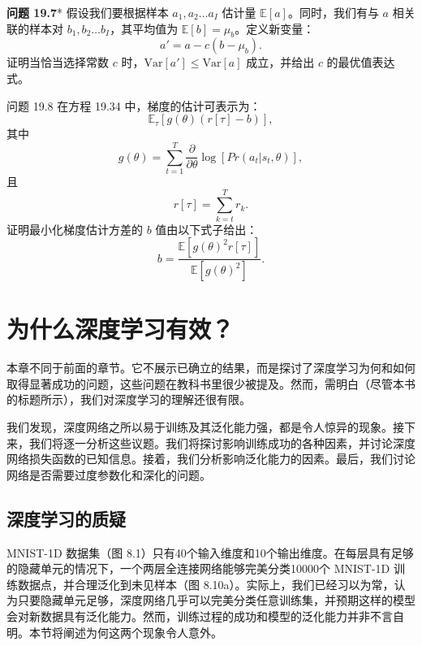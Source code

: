 \documentclass[lang=cn,newtx,10pt,scheme=chinese]{elegantbook}
\begin{document}
\textbf{问题 19.7}* 假设我们要根据样本 \(a_1, a_2 \ldots a_I\) 估计量 \(\mathbb{E}[a]\)。同时，我们有与 \(a\) 相关联的样本对 \(b_1, b_2 \ldots b_I\)，其平均值为 \(\mathbb{E}[b] = \mu_b\)。定义新变量：
\begin{equation}
a' = a - c(b - \mu_b). 
\end{equation}
证明当恰当选择常数 \(c\) 时，\(\text{Var}[a'] \leq \text{Var}[a]\) 成立，并给出 \(c\) 的最优值表达式。

问题 19.8 在方程 19.34 中，梯度的估计可表示为：
\begin{equation}
\mathbb{E}_\tau \left[ g(\theta)(r[\tau] - b) \right], 
\end{equation}
其中
\begin{equation}
g(\theta) = \sum_{t=1}^{T} \frac{\partial}{\partial \theta} \log[Pr(a_t|s_t, \theta)], 
\end{equation}
且
\begin{equation}
r[\tau] = \sum_{k=t}^{T} r_k. 
\end{equation}
证明最小化梯度估计方差的 \(b\) 值由以下式子给出：
\begin{equation}
b = \frac{\mathbb{E}[g(\theta)^2r[\tau]]}{\mathbb{E}[g(\theta)^2]}. 
\end{equation}

\chapter{为什么深度学习有效？}

本章不同于前面的章节。它不展示已确立的结果，而是探讨了深度学习为何和如何取得显著成功的问题，这些问题在教科书里很少被提及。然而，需明白（尽管本书的标题所示），我们对深度学习的理解还很有限。

我们发现，深度网络之所以易于训练及其泛化能力强，都是令人惊异的现象。接下来，我们将逐一分析这些议题。我们将探讨影响训练成功的各种因素，并讨论深度网络损失函数的已知信息。接着，我们分析影响泛化能力的因素。最后，我们讨论网络是否需要过度参数化和深化的问题。

\section{深度学习的质疑}
MNIST-1D 数据集（图 8.1）只有40个输入维度和10个输出维度。在每层具有足够的隐藏单元的情况下，一个两层全连接网络能够完美分类10000个 MNIST-1D 训练数据点，并合理泛化到未见样本（图 8.10a）。实际上，我们已经习以为常，认为只要隐藏单元足够，深度网络几乎可以完美分类任意训练集，并预期这样的模型会对新数据具有泛化能力。然而，训练过程的成功和模型的泛化能力并非不言自明。本节将阐述为何这两个现象令人意外。
\end{document}
